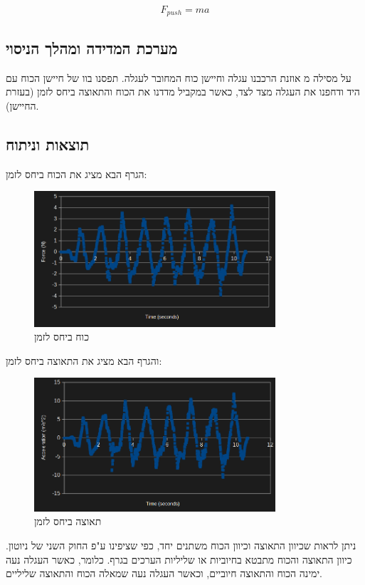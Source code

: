 \documentclass[14pt]{extarticle}
\begin{document}
\begin{equation}
F_{push} = m a
\end{equation}
\subsection*{מערכת המדידה ומהלך הניסוי}
על  מסילה מ אוזנת הרכבנו עגלה וחיישן כוח המחובר לעגלה.
תפסנו בוו של  חיישן הכוח עם היד ודחפנו את העגלה מצד לצד, כאשר במקביל מדדנו  את הכוח והתאוצה  ביחס לזמן (בעזרת החיישן).
\subsection*{תוצאות וניתוח}
הגרף הבא מציג את הכוח ביחס לזמן:
\begin{figure}[H]
    \centering
    \includegraphics[width=0.8\textwidth]{maman_13_experiment_3_force_to_time.png}
    \caption{כוח ביחס לזמן}
\end{figure}
והגרף הבא מציג את התאוצה ביחס לזמן:
\begin{figure}[H]
    \centering
    \includegraphics[width=0.8\textwidth]{maman_13_experiment_3_acceleration_to_time.png}
    \caption{תאוצה ביחס לזמן}
\end{figure}

ניתן לראות שכיוון התאוצה וכיוון הכוח משתנים יחד, כפי שציפינו ע"פ החוק השני של ניוטון.
כיוון התאוצה והכוח מתבטא בחיוביות או שליליות הערכים בגרף. כלומר, כאשר העגלה נעה ימינה הכוח והתאוצה חיוביים, וכאשר העגלה נעה שמאלה הכוח והתאוצה שליליים.
\end{document}
